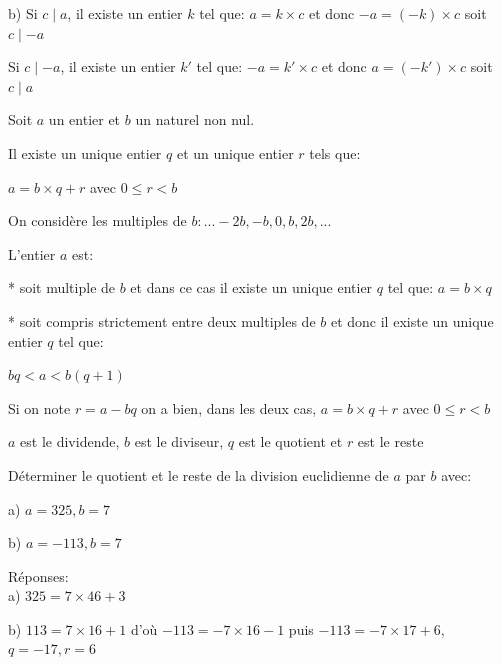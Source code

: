 \documentclass[french]{book}
\begin{document}
 \begin{demo}

b) Si $c\mid a$, il existe un entier $k$ tel que: $a=k \times c$ et donc $-a=\left( -k\right) \times c$ soit $c\mid-a$

Si $c\mid -a$, il existe un entier $k'$ tel que: $-a=k' \times c$ et donc $a=\left( -k'\right) \times c$ soit $c\mid a$

\end{demo}






\begin{thm}
Soit $a$ un entier et $b$ un naturel non nul.

Il existe un unique entier $q$ et un unique entier $r$ tels que:
\begin{center}
$a=b \times q+r$ avec $0\leq r < b$
\end{center}

\end{thm}

\begin{demo}
On considère les multiples de $b: ...-2b, -b, 0, b, 2b, ...$

L'entier $a$ est:

* soit multiple de $b$ et dans ce cas il existe un unique entier $q$ tel que: $a=b \times q$

* soit compris strictement entre deux multiples de $b$ et donc il existe un unique entier $q$ tel que:

\hspace{3cm}$bq < a < b\left( q+1\right) $

Si on note $r=a-bq$ on a bien, dans les deux cas, $a=b \times q+r$ avec $0\leq r < b$

\end{demo}


\begin{rem}

$a$ est le dividende,
$b$ est le diviseur,
$q$ est le quotient et
$r$ est le reste
\end{rem}

\begin{exemple}
Déterminer le quotient et le reste de la division euclidienne de $a$ par $b$ avec:

a) $a=325, b=7$

b) $a=-113, b=7$


Réponses: \\

a) $325=7 \times 46+3$

b) $113=7 \times 16 +1$ d'où $-113=-7 \times 16 -1$ puis $-113=-7 \times 17+6$, $q=-17, r=6$


\end{exemple}
\end{document}
